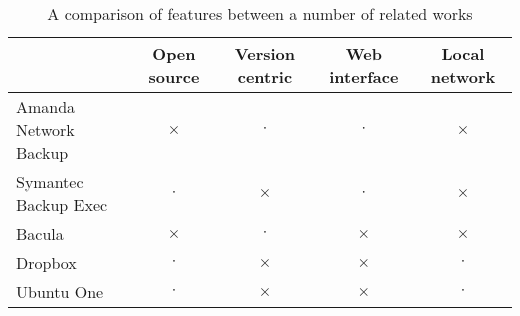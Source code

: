 \begin{table}[H]
    \centering
    \begin{tabular}{ | l | c | c | c | c | }
        \hline
        & Open source   & Version centric   & Web interface & Local network
            \\ \hline

        Amanda Network Backup   & $\times$  & $\cdot$   & $\cdot$   & $\times$
            \\ \hline

        Symantec Backup Exec    & $\cdot$   & $\times$  & $\cdot$   & $\times$
            \\ \hline

        Bacula                  & $\times$  & $\cdot$   & $\times$  & $\times$
            \\ \hline

        Dropbox                 & $\cdot$   & $\times$  & $\times$  & $\cdot$
            \\ \hline

        Ubuntu One              & $\cdot$   & $\times$  & $\times$  & $\cdot$
            \\ \hline
    \end{tabular}
    \caption{A comparison of features between a number of related works}
    \label{tab:feature-comparison}
\end{table}
